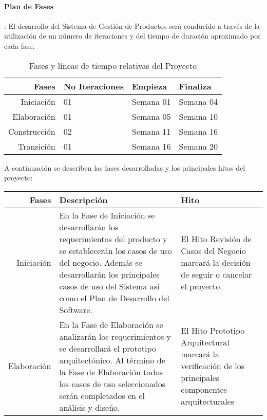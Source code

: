 \documentclass[a4paper,11pt, spanish]{report}
\begin{document}
{{{{{{{{            \paragraph{Plan de Fases}: El desarrollo del Sistema de Gestión de Productos será conducido a través de la utilización de un número de iteraciones y del tiempo de duración aproximado por cada fase.
            {\renewcommand{\arraystretch}{1.7}%
            \noindent\begin{table}[H]
            \noindent\begin{tabularx}{\textwidth}{r|X|X|X}
            \textbf{{\large Fases}} & \textbf{{\large No Iteraciones}} & \textbf{{\large Empieza}} & \textbf{{\large Finaliza}} \\ \hline
            Iniciación & 01 & Semana 01 & Semana 04 \\ \hline
            Elaboración & 01 & Semana 05 & Semana 10 \\ \hline
            Construcción & 02 & Semana 11 & Semana 16 \\ \hline
            Transición & 01 & Semana 16 & Semana 20 \\ \hline
            \end{tabularx}
            \caption{Fases y líneas de tiempo relativas del Proyecto}
            \end {table}
                A continuación se describen las fases desarrolladas y los principales hitos del proyecto:
            {\renewcommand{\arraystretch}{1.5}%
            \noindent\begin{table}[H]
            \noindent\begin{tabularx}{\textwidth}{r|X|X}
            \textbf{{\large Fases}} & \textbf{{\large Descripción}} & \textbf{{\large Hito}} \\ \hline
            Iniciación & En la Fase de Iniciación se desarrollarán los requerimientos del producto y se establecerán los casos de uso del negocio. Además se desarrollarán los principales casos de uso del Sistema así como el Plan de Desarrollo del Software.  & El Hito Revisión de Casos del Negocio marcará la decisión de seguir o cancelar el proyecto.  \\ \hline
            Elaboración & En la Fase de Elaboración se analizarán los requerimientos y  se desarrollará el prototipo arquitectónico. Al término de la Fase de Elaboración todos los casos de uso seleccionados serán completados en el análisis y diseño.  & El Hito Prototipo Arquitectural marcará la verificación de los principales componentes arquitecturales \\ \hline

\end{tabularx}
\end{table}}}}}}}}}}}
\end{document}
